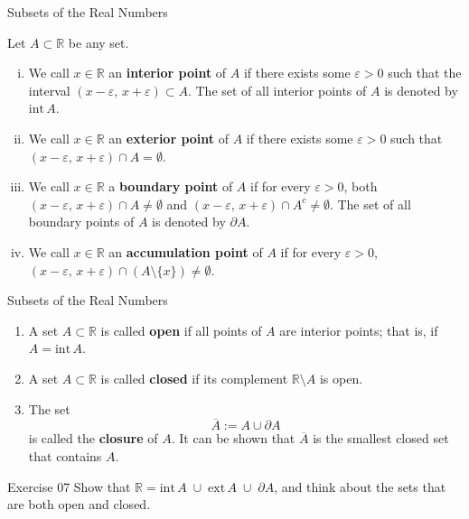 \documentclass[dvipsnames]{beamer}
\theoremstyle{plain}
\theoremstyle{definition}
\begin{document}
\begin{frame}{Subsets of the Real Numbers}

\begin{definition}
Let \( A \subset \mathbb{R} \) be any set.

\begin{enumerate}[(i)]
\item We call \( x \in \mathbb{R} \) an \textbf{interior point} of \( A \) if there exists some \( \varepsilon > 0 \)
such that the interval \( (x - \varepsilon,\, x + \varepsilon) \subset A \).
The set of all interior points of \( A \) is denoted by \( \mathrm{int}\,A \).

\item We call \( x \in \mathbb{R} \) an \textbf{exterior point} of \( A \) if there exists some \( \varepsilon > 0 \)
such that \( (x - \varepsilon,\, x + \varepsilon) \cap A = \emptyset \).

\item We call \( x \in \mathbb{R} \) a \textbf{boundary point} of \( A \) if for every \( \varepsilon > 0 \),
both \( (x - \varepsilon,\, x + \varepsilon) \cap A \neq \emptyset \) and
\( (x - \varepsilon,\, x + \varepsilon) \cap A^{c} \neq \emptyset \).
The set of all boundary points of \( A \) is denoted by \( \partial A \).

\item We call \( x \in \mathbb{R} \) an \textbf{accumulation point} of \( A \) if for every \( \varepsilon > 0 \),
\( (x - \varepsilon,\, x + \varepsilon) \cap (A \setminus \{x\}) \neq \emptyset \).
\end{enumerate}
\end{definition}

\end{frame}


\begin{frame}{Subsets of the Real Numbers}

\begin{definition}
\begin{enumerate}
\item A set \( A \subset \mathbb{R} \) is called \textbf{open} if all points of \( A \) are interior points;  
that is, if \( A = \mathrm{int}\,A \).

\item A set \( A \subset \mathbb{R} \) is called \textbf{closed} if its complement \( \mathbb{R} \setminus A \) is open.

\item The set
\[
\overline{A} := A \cup \partial A
\]
is called the \textbf{closure} of \( A \).  
It can be shown that \( \overline{A} \) is the smallest closed set that contains \( A \).
\end{enumerate}
\end{definition}

\begin{block}{Exercise 07}
    Show that \(\mathbb{R} = \mathrm{int}\,A \;\cup\; \mathrm{ext}\,A \;\cup\; \partial A\), and think about the sets that are both open and closed.
\end{block}
\end{frame}
\end{document}
